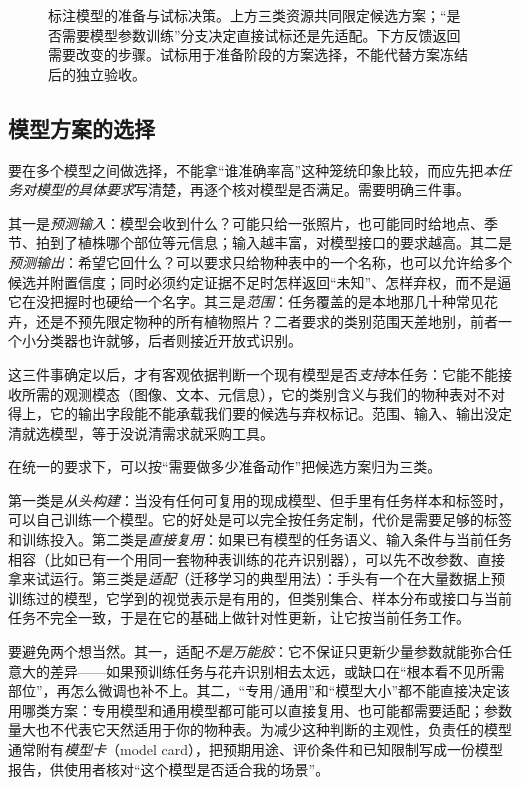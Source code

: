 \begin{figure}[htbp]
  \centering
  
  \caption{标注模型的准备与试标决策。上方三类资源共同限定候选方案；“是否需要模型参数训练”分支决定直接试标还是先适配。下方反馈返回需要改变的步骤。试标用于准备阶段的方案选择，不能代替方案冻结后的独立验收。}
  \label{fig:knowledge-acquisition-model-preparation}
\end{figure}

\subsection{模型方案的选择}
\label{sec:knowledge-acquisition-model-scheme-selection}

要在多个模型之间做选择，不能拿“谁准确率高”这种笼统印象比较，而应先把\emph{本任务对模型的具体要求}写清楚，再逐个核对模型是否满足。需要明确三件事。

其一是\emph{预测输入}：模型会收到什么？可能只给一张照片，也可能同时给地点、季节、拍到了植株哪个部位等元信息；输入越丰富，对模型接口的要求越高。其二是\emph{预测输出}：希望它回什么？可以要求只给物种表中的一个名称，也可以允许给多个候选并附置信度；同时必须约定证据不足时怎样返回“未知”、怎样弃权，而不是逼它在没把握时也硬给一个名字。其三是\emph{范围}：任务覆盖的是本地那几十种常见花卉，还是不预先限定物种的所有植物照片？二者要求的类别范围天差地别，前者一个小分类器也许就够，后者则接近开放式识别。

这三件事确定以后，才有客观依据判断一个现有模型是否\emph{支持}本任务：它能不能接收所需的观测模态（图像、文本、元信息），它的类别含义与我们的物种表对不对得上，它的输出字段能不能承载我们要的候选与弃权标记。范围、输入、输出没定清就选模型，等于没说清需求就采购工具。

在统一的要求下，可以按“需要做多少准备动作”把候选方案归为三类。

第一类是\emph{从头构建}：当没有任何可复用的现成模型、但手里有任务样本和标签时，可以自己训练一个模型。它的好处是可以完全按任务定制，代价是需要足够的标签和训练投入。第二类是\emph{直接复用}：如果已有模型的任务语义、输入条件与当前任务相容（比如已有一个用同一套物种表训练的花卉识别器），可以先不改参数、直接拿来试运行。第三类是\emph{适配}（迁移学习的典型用法）：手头有一个在大量数据上预训练过的模型，它学到的视觉表示是有用的，但类别集合、样本分布或接口与当前任务不完全一致，于是在它的基础上做针对性更新，让它按当前任务工作。

要避免两个想当然。其一，适配\emph{不是万能胶}：它不保证只更新少量参数就能弥合任意大的差异——如果预训练任务与花卉识别相去太远，或缺口在“根本看不见所需部位”，再怎么微调也补不上。其二，“专用/通用”和“模型大小”都不能直接决定该用哪类方案：专用模型和通用模型都可能可以直接复用、也可能都需要适配；参数量大也不代表它天然适用于你的物种表。为减少这种判断的主观性，负责任的模型通常附有\emph{模型卡}（model card），把预期用途、评价条件和已知限制写成一份模型报告，供使用者核对“这个模型是否适合我的场景”。

